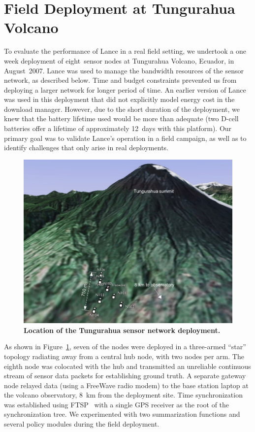 \section{Field Deployment at Tungurahua Volcano}
\label{lance-sec-deployment}

To evaluate the performance of Lance in a real field setting, we undertook a
one week deployment of eight~sensor nodes at Tungurahua Volcano, Ecuador, in
August~2007. Lance was used to manage the bandwidth resources of the sensor
network, as described below. Time and budget constraints prevented us from
deploying a larger network for longer period of time. An earlier version of
Lance was used in this deployment that did not explicitly model energy cost
in the download manager. However, due to the short duration of the
deployment, we knew that the battery lifetime used would be more than
adequate (two D-cell batteries offer a lifetime of approximately 12~days with
this platform). Our primary goal was to validate Lance's operation in a field
campaign, as well as to identify challenges that only arise in real
deployments.

\begin{figure}[t]
\begin{center}
\includegraphics[width=0.7\hsize]{./4-lance/figs/map.pdf}
\end{center}

\caption{\textbf{Location of the Tungurahua sensor network deployment.}}

\label{lance-fig-map}
\end{figure}

As shown in Figure~\ref{lance-fig-map}, seven of the nodes were deployed in a
three-armed ``star'' topology radiating away from a central hub node, with
two nodes per arm. The eighth node was colocated with the hub and transmitted
an unreliable continuous stream of sensor data packets for establishing
ground truth. A separate gateway node relayed data (using a FreeWave radio
modem) to the base station laptop at the volcano observatory, 8~km from the
deployment site. Time synchronization was established using FTSP~\cite{ftsp}
with a single GPS receiver as the root of the synchronization tree. We
experimented with two summarization functions and several policy modules
during the field deployment.


